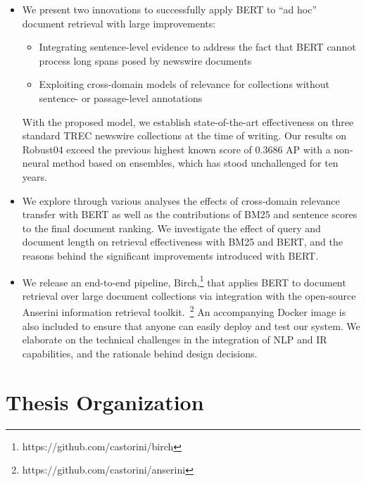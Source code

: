 \begin{itemize}
	\item
	We present two innovations to successfully apply BERT to ``ad hoc'' document retrieval 	with large improvements:\
	\begin{itemize}
		\item Integrating sentence-level evidence to address the fact that BERT cannot process long spans posed by newswire documents
		\item Exploiting cross-domain models of relevance for collections without sentence- or passage-level annotations
	\end{itemize}
	With the proposed model, we establish state-of-the-art effectiveness on three standard TREC newswire collections at the time of writing.
	Our results on Robust04 exceed the previous highest known score of 0.3686 AP \cite{Cormack:2009:RRF:1571941.1572114} with a non-neural method based on ensembles, which has stood unchallenged for ten years.

	\item
	We explore through various analyses the effects of cross-domain relevance transfer with BERT as well as the contributions of BM25 and sentence scores to the final document ranking.
	We investigate the effect of query and document length on retrieval effectiveness with BM25 and BERT, and the reasons behind the significant improvements introduced with BERT.

	\item
	We release an end-to-end pipeline, Birch,\footnote{https://github.com/castorini/birch} that applies BERT to document retrieval over large document collections via integration with the open-source Anserini information retrieval toolkit.~\footnote{https://github.com/castorini/anserini}
	An accompanying Docker image is also included to ensure that anyone can easily deploy and test our system.
	We elaborate on the technical challenges in the integration of NLP and IR capabilities, and the rationale behind design decisions.
\end{itemize}

\newpage

\section{Thesis Organization}

